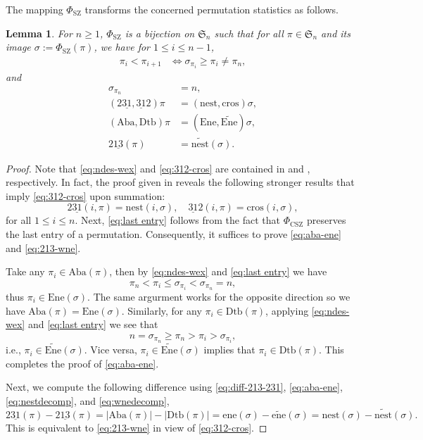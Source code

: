 \documentclass[12pt,reqno]{amsart}
\numberwithin{equation}{section}
\theoremstyle{plain}
\newtheorem{lemma}[theorem]{Lemma}
\theoremstyle{definition}
\def\Sym{\mathfrak{S}}
\def\CSZ{\mathrm{CSZ}}
\def\SZ{\mathrm{SZ}}
\def\rasc{\mathrm{2\underline{13}}}
\def\rdes{\mathrm{2\underline{31}}}
\def\ldes{\mathrm{\underline{31}2}}
\def\nest{\mathrm{nest}}
\def\cros{\mathrm{cros}}
\def\ene{\mathrm{ene}}
\def\wene{\widetilde{\mathrm{ene}}}
\def\wne{\widetilde{\mathrm{nest}}}
\def\Ene{\mathrm{Ene}}
\def\Wene{\widetilde{\mathrm{Ene}}}
\def\Aba{\mathrm{Aba}}
\def\Dtb{\mathrm{Dtb}}
\def\Ene{\mathrm{Ene}}
\begin{document}
The mapping $\Phi_{\SZ}$ transforms the concerned permutation statistics as follows.
\begin{lemma}\label{lem:SZ}
For $n\ge 1$, $\Phi_{\SZ}$ is a bijection on $\Sym_n$ such that for all $\pi\in\Sym_n$ and its image $\sigma:=\Phi_{\SZ}(\pi)$, we have for $1\le i\le n-1$,
\begin{align}
\label{eq:ndes-wex}
\pi_i<\pi_{i+1} &\Longleftrightarrow \sigma_{\pi_i}\ge \pi_i\neq\pi_n,
\end{align}
and
\begin{align}
\label{eq:last entry}
\sigma_{\pi_n} &=n,\\
\label{eq:312-cros}
(\rdes,\ldes) \pi &= (\nest,\cros) \sigma,\\
(\Aba,\Dtb) \pi &= (\Ene,\Wene) \sigma,\label{eq:aba-ene}\\
\rasc(\pi) &= \wne(\sigma).
\label{eq:213-wne}
\end{align}
\end{lemma}
\begin{proof}
Note that \eqref{eq:ndes-wex} and \eqref{eq:312-cros} are contained in \cite[Eq.~(31)]{SZ10} and \cite[Eq.~(30)]{SZ10}, respectively. In fact, the proof given in \cite{SZ10} reveals the following stronger results that imply \eqref{eq:312-cros} upon summation:
$$\rdes(i,\pi)=\nest(i,\sigma),\quad \ldes(i,\pi)=\cros(i,\sigma),$$
for all $1\le i\le n$. Next, \eqref{eq:last entry} follows from the fact that $\Phi_{\CSZ}$ preserves the last entry of a permutation. Consequently, it suffices to prove \eqref{eq:aba-ene} and \eqref{eq:213-wne}.

Take any $\pi_i\in\Aba(\pi)$, then by \eqref{eq:ndes-wex} and \eqref{eq:last entry} we have $$\pi_n<\pi_i\le\sigma_{\pi_i}<\sigma_{\pi_n}=n,$$
thus $\pi_i\in\Ene(\sigma)$. The same argurment works for the opposite direction so we have $\Aba(\pi)=\Ene(\sigma)$. Similarly, for any $\pi_i\in\Dtb(\pi)$, applying \eqref{eq:ndes-wex} and \eqref{eq:last entry} we see that
$$n=\sigma_{\pi_n}\ge \pi_n>\pi_i>\sigma_{\pi_i},$$
i.e., $\pi_i\in\Wene(\sigma)$. Vice versa, $\pi_i\in\Wene(\sigma)$ implies that $\pi_i\in\Dtb(\pi)$. This completes the proof of \eqref{eq:aba-ene}.

Next, we compute the following difference using \eqref{eq:diff-213-231}, \eqref{eq:aba-ene}, \eqref{eq:nestdecomp}, and \eqref{eq:wnedecomp},
$$\rdes(\pi)-\rasc(\pi)=|\Aba(\pi)|-|\Dtb(\pi)|=\ene(\sigma)-\wene(\sigma)=\nest(\sigma)-\wne(\sigma).$$
This is equivalent to \eqref{eq:213-wne} in view of \eqref{eq:312-cros}.
\end{proof}
\end{document}
